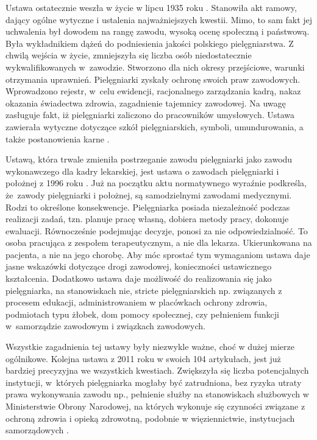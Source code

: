 \documentclass[a4paper,12pt,twoside,openright]{mwrep}
\begin{document}
Ustawa ostatecznie weszła w życie w lipcu 1935 roku \cite{usta}. Stanowiła akt ramowy, dający ogólne wytyczne i ustalenia najważniejszych kwestii. Mimo, to sam fakt jej uchwalenia był dowodem na rangę zawodu, wysoką ocenę społeczną i państwową. Była wykładnikiem dążeń do podniesienia jakości polskiego pielęgniarstwa. Z chwilą wejścia w życie, zmniejszyła się liczba osób niedostatecznie wykwalifikowanych w~zawodzie. Stworzono dla nich okresy przejściowe, warunki otrzymania uprawnień. Pielęgniarki zyskały ochronę swoich praw zawodowych. Wprowadzono rejestr, w~celu ewidencji, racjonalnego zarządzania kadrą, nakaz okazania świadectwa zdrowia, zagadnienie tajemnicy zawodowej. Na uwagę zasługuje fakt, iż pielęgniarki zaliczono do pracowników umysłowych. Ustawa zawierała wytyczne dotyczące szkół pielęgniarskich, symboli, umundurowania, a także postanowienia karne \cite{1935}.

Ustawą, która trwale zmieniła postrzeganie zawodu pielęgniarki jako zawodu wykonawczego dla kadry lekarskiej, jest ustawa o zawodach pielęgniarki i położnej z 1996 roku \cite{1996}. Już na początku aktu normatywnego wyraźnie podkreśla, że~zawody pielęgniarki i położnej, są samodzielnymi zawodami medycznymi. Rodzi to określone konsekwencje. Pielęgniarka posiada niezależność podczas realizacji zadań, tzn. planuje pracę własną, dobiera metody pracy, dokonuje ewaluacji. Równocześnie podejmując decyzje, ponosi za nie odpowiedzialność. To osoba pracująca z zespołem terapeutycznym, a nie dla lekarza. Ukierunkowana na pacjenta, a nie na jego chorobę. Aby móc sprostać tym wymaganiom ustawa daje jasne wskazówki dotyczące drogi zawodowej, konieczności ustawicznego kształcenia. Dodatkowo ustawa daje możliwość do realizowania się jako pielęgniarka, na stanowiskach nie, stricte pielęgniarskich np. związanych z procesem edukacji, administrowaniem w placówkach ochrony zdrowia, podmiotach typu żłobek, dom pomocy społecznej, czy pełnieniem funkcji w~samorządzie zawodowym i związkach zawodowych.

Wszystkie zagadnienia tej ustawy były niezwykle ważne, choć w dużej mierze ogólnikowe. Kolejna ustawa z 2011 roku w swoich 104 artykułach, jest już bardziej precyzyjna we wszystkich kwestiach. Zwiększyła się liczba potencjalnych instytucji, w~których pielęgniarka mogłaby być zatrudniona, bez ryzyka utraty prawa wykonywania zawodu np., pełnienie służby na stanowiskach służbowych w Ministerstwie Obrony Narodowej, na których wykonuje się czynności związane z ochroną zdrowia i opieką zdrowotną, podobnie w więziennictwie, instytucjach samorządowych \cite{2011}. 
\end{document}
